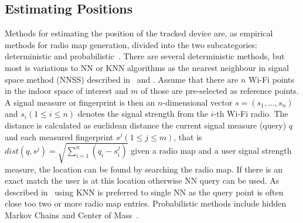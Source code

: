 \subsection{Estimating Positions}
Methods for estimating the position of the tracked device are, as empirical methods for radio map generation, divided into the two subcategories: deterministic and probabilistic~\cite{taxonomy2007}.
There are several deterministic methods, but most is variations to NN or KNN algorithms as
the nearest neighbour in signal space method (NNSS)
described in~\cite{6068444} and \cite{radarlf}.
Assume that there are $n$ Wi-Fi points in the indoor space of interest and $m$ of those are pre-selected as reference points. 
A signal measure or fingerprint is then an $n$-dimensional vector $s=(s_{1},\dots,s_{n})$ and $s_{i} (1 \le  i \le n)$ denotes the signal strength from the $i$-th Wi-Fi radio. 
The distance is calculated as euclidean distance the current signal measure (query) $q$ and each measured fingerprint $s^{j} (1 \le j \le m)$, 
that is $dist(q,s^{j}) = \sqrt{\sum_{i=1}^{n}\left(q_{i}-s^{j}_{i}\right)}$ 
given a radio map and a user signal strength measure, the location can be found by searching the radio map. 
If there is an exact match the user is at this location otherwise NN query can be used.
As described in~\cite{ariadne2006} using KNN is preferred to single NN as the query point is often close too two or more radio map entries.
Probabilistic methods include hidden Markov Chains and Center of Mass~\cite{Youssef2005}.

 






